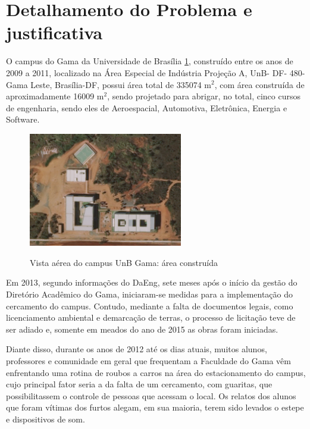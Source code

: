 \section{Detalhamento do Problema e justificativa} %
\label{sec:detalhamentoProblema}

O campus do Gama da Universidade de Brasília \ref{img:fga1}, construído entre os anos de 2009 a 2011, localizado na Área Especial de Indústria Projeção A, UnB- DF- 480- Gama Leste, Brasília-DF, possui área total de 335074 m$^2$, com área construída de aproximadamente 16009 m$^2$, sendo projetado para abrigar, no total, cinco cursos de engenharia, sendo eles de Aeroespacial, Automotiva, Eletrônica, Energia e Software.

\begin{figure}[H]
	\centering
	\caption[Vista aérea do campus UnB Gama: área construída]{Vista aérea do campus UnB Gama: área construída~\cite{mapa1}}
	\includegraphics[width=0.6\textwidth]{figuras/fga1}
	\label{img:fga1}
\end{figure}


Em 2013, segundo informações do DaEng, sete meses após o início da gestão do Diretório Acadêmico do Gama, iniciaram-se medidas para a implementação do cercamento do campus. Contudo, mediante a falta de documentos legais, como licenciamento ambiental e demarcação de terras, o processo de licitação teve de ser adiado e, somente em meados do ano de 2015 as obras foram iniciadas.

Diante disso, durante os anos de 2012 até os dias atuais, muitos alunos, professores e comunidade em geral que frequentam a Faculdade do Gama vêm enfrentando uma rotina de roubos a carros na área do estacionamento do campus, cujo principal fator seria a da falta de um cercamento, com guaritas, que possibilitassem o controle de pessoas que acessam o local. Os relatos dos alunos que foram vítimas dos furtos alegam, em sua maioria, terem sido levados o estepe e dispositivos de som.

